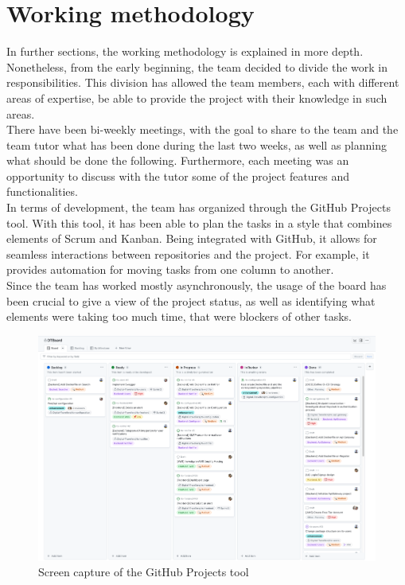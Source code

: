 \documentclass[../memory.tex]{subfiles}
\begin{document}
\section{Working methodology}
In further sections, the working methodology is explained in more depth.
Nonetheless, from the early beginning, the team decided to divide the work in
responsibilities. This division has allowed the team members, each with
different areas of expertise, be able to provide the project with their
knowledge in such areas.
\\
There have been bi-weekly meetings, with the goal to share to the team and the
team tutor what has been done during the last two weeks, as well as planning
what should be done the following. Furthermore, each meeting was an opportunity
to discuss with the tutor some of the project features and functionalities.
\\[8pt]
In terms of development, the team has organized through the GitHub Projects tool.
With this tool, it has been able to plan the tasks in a style that combines
elements of Scrum and Kanban. Being integrated with GitHub, it allows for
seamless interactions between repositories and the project. For example, it
provides automation for moving tasks from one column to another.
\\
Since the team has worked mostly asynchronously, the usage of the board has been
crucial to give a view of the project status, as well as identifying what
elements were taking too much time, that were blockers of other tasks.
\begin{figure}[H]
	\centering
	\includegraphics[width=\textwidth]{./assets/github-projects.png}
	\caption{Screen capture of the GitHub Projects tool}
\end{figure}
\end{document}
